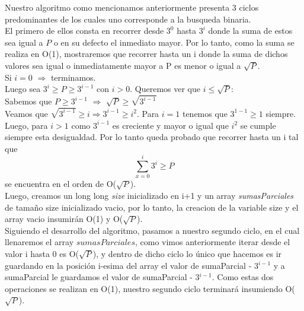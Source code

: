 
Nuestro algoritmo como mencionamos anteriormente presenta 3 ciclos predominantes de los cuales uno corresponde a la busqueda binaria.\\
El primero de ellos consta en recorrer desde $3^0$ hasta $3^i$ donde la suma de estos sea igual a $P$ o en su defecto el inmediato mayor. Por lo tanto, como la suma se realiza en O(1), mostraremos que recorrer hasta un i donde la suma de dichos valores sea igual o inmediatamente mayor a P es menor o igual a $\sqrt{P}$.\\
  
Si $i = 0$ $\Rightarrow$ terminamos.\\
Luego sea $3^i \geq P \geq 3^{i-1}$ con $i > 0$. Queremos ver que $i \leq \sqrt{P}$:\\
Sabemos que $P \geq 3^{i-1}$ $\Rightarrow$ $\sqrt{P} \geq \sqrt{3^{i-1}}$\\
Veamos que $\sqrt{3^{i-1}} \geq i \Rightarrow 3^{i-1} \geq {i^2}$. Para $i = 1$ tenemos que $3^{1-1} \geq 1$ siempre. Luego, para $i > 1$ como ${3^{i-1}}$ es creciente y mayor o igual que $i^2$ se cumple siempre esta desigualdad. Por lo tanto queda probado que recorrer hasta un i tal que \[
\sum_{x=0}^{i}3^{i} \geq P \] se encuentra en el orden de  O($\sqrt{P}$).\\

 Luego, creamos un long long \textit{size} inicializado en i+1 y un array \textit{sumasParciales} de tamaño size inicializado vacio, por lo tanto, la creacion de la variable size y el array vacio insumir\'an O(1) y O($\sqrt{P}$).\\
 
Siguiendo el desarrollo del algoritmo, pasamos a nuestro segundo ciclo, en el cual llenaremos el array $sumasParciales$, como vimos anteriormente iterar desde el valor i hasta 0 es O($\sqrt{P}$), y dentro de dicho ciclo lo \'unico que hacemos es ir guardando en la posici\'on i-esima del array el valor de sumaParcial - 3$^{i-1}$ y a sumaParcial le guardamos el valor de sumaParcial - 3$^{i-1}$. Como estas dos operaciones se realizan en O(1), nuestro segundo ciclo terminar\'a insumiendo O($\sqrt{P}$).\\

